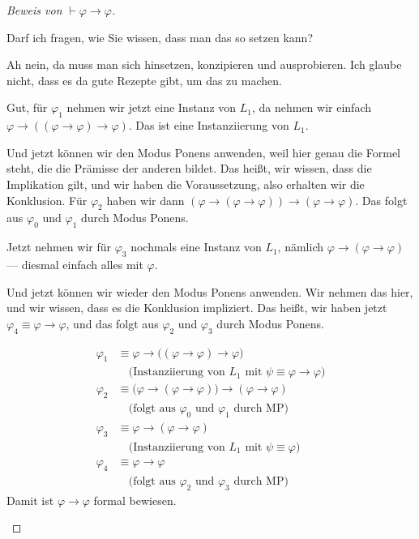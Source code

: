 \begin{proof}[Beweis von $\vdash \varphi \to \varphi$]
\begin{student-interaction}
Darf ich fragen, wie Sie wissen, dass man das so setzen kann?
\end{student-interaction}

\begin{spoken-clean}[00:36:57 - 00:38:57]
Ah nein, da muss man sich hinsetzen, konzipieren und ausprobieren. Ich glaube nicht, dass es da gute Rezepte gibt, um das zu machen. 

Gut, für $\varphi_1$ nehmen wir jetzt eine Instanz von $L_1$, da nehmen wir einfach $\varphi \to ((\varphi \to \varphi) \to \varphi)$. Das ist eine Instanziierung von $L_1$.

Und jetzt können wir den Modus Ponens anwenden, weil hier genau die Formel steht, die die Prämisse der anderen bildet. Das heißt, wir wissen, dass die Implikation gilt, und wir haben die Voraussetzung, also erhalten wir die Konklusion. Für $\varphi_2$ haben wir dann $(\varphi \to (\varphi \to \varphi)) \to (\varphi \to \varphi)$. Das folgt aus $\varphi_0$ und $\varphi_1$ durch Modus Ponens.

Jetzt nehmen wir für $\varphi_3$ nochmals eine Instanz von $L_1$, nämlich $\varphi \to (\varphi \to \varphi)$ --- diesmal einfach alles mit $\varphi$.

Und jetzt können wir wieder den Modus Ponens anwenden. Wir nehmen das hier, und wir wissen, dass es die Konklusion impliziert. Das heißt, wir haben jetzt $\varphi_4 \equiv \varphi \to \varphi$, und das folgt aus $\varphi_2$ und $\varphi_3$ durch Modus Ponens.
\end{spoken-clean}

\begin{math-stroke}
\begin{align*}
    \varphi_1 &\equiv \varphi \to \bigl((\varphi \to \varphi) \to \varphi\bigr) \\
    &\quad \text{(Instanziierung von } L_1 \text{ mit } \psi \equiv \varphi \to \varphi\text{)} \\
    \varphi_2 &\equiv \bigl(\varphi \to (\varphi \to \varphi)\bigr) \to (\varphi \to \varphi) \\
    &\quad \text{(folgt aus } \varphi_0 \text{ und } \varphi_1 \text{ durch MP)} \\
    \varphi_3 &\equiv \varphi \to (\varphi \to \varphi) \\
    &\quad \text{(Instanziierung von } L_1 \text{ mit } \psi \equiv \varphi\text{)} \\
    \varphi_4 &\equiv \varphi \to \varphi \\
    &\quad \text{(folgt aus } \varphi_2 \text{ und } \varphi_3 \text{ durch MP)}
\end{align*}
Damit ist $\varphi \to \varphi$ formal bewiesen.
\end{math-stroke}
\end{proof}

